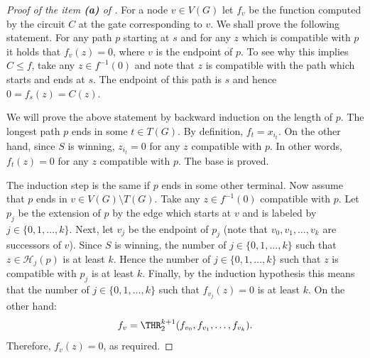 \begin{proof}[Proof of the item \textbf{(a)} of ]
For a node $v \in V(G)$ let $f_v$ be the function computed by the circuit $C$ at the gate corresponding to $v$. We shall prove the following statement. For any path $p$ starting at $s$ and for any $z$ which is compatible with $p$ it holds that $f_v(z) = 0$, where $v$ is the endpoint of $p$. To see why this implies $C\le f$, take any $z\in f^{-1}(0)$ and note that $z$ is compatible with the path which starts and ends at $s$. The endpoint of this path is $s$ and hence $0 = f_s(z) = C(z)$.

We will prove the above statement by backward induction on the length of $p$. The longest path $p$ ends in some $t\in T(G)$. By definition, $f_t = x_{i_t}$. On the other hand, since $S$ is winning, $z_{i_t} = 0$ for any $z$ compatible with $p$. In other words, $f_t(z) = 0$ for any $z$ compatible with $p$. The base is proved.

The induction step is the same if $p$ ends in some other terminal. Now assume that $p$ ends in $v\in V(G)\setminus T(G)$. Take any $z\in f^{-1}(0)$ compatible with $p$. Let $p_j$ be the extension of $p$ by the edge which starts at $v$ and is labeled by $j\in\{0, 1, \ldots, k\}$. Next, let $v_j$ be the endpoint of $p_j$ (note that $v_0, v_1, \ldots, v_k$ are successors of $v$). Since $S$ is winning, the number of $j\in\{0, 1, \ldots, k\}$ such that $z\in \mathcal{H}_j(p)$ is at least $k$. Hence the number of $j\in \{0, 1, \ldots, k\}$ such that $z$ is compatible with $p_j$ is at least $k$. Finally, by the induction hypothesis this means that the number of $j\in\{0, 1, \ldots, k\}$ such that $f_{v_j}(z) = 0$ is at least $k$. On the other hand:
\[f_v = \THR^{k + 1}_2(f_{v_0}, f_{v_1}, \ldots, f_{v_k}).\]
Therefore, $f_v(z) = 0$, as required.
\end{proof}

